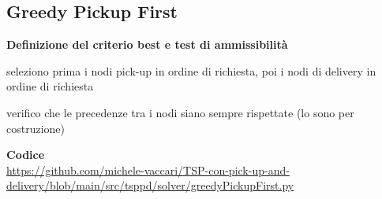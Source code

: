 \documentclass[9pt]{beamer}
\begin{document}
\subsection{Greedy Pickup First}
\begin{frame}[allowframebreaks]{\subsecname}
	\textbf{Definizione del criterio best e test di ammissibilità}
      \begin{description}[style=unboxed,leftmargin=0cm]
        \item[criterio best] seleziono prima i nodi pick-up in ordine di richiesta, poi i nodi di delivery in ordine di richiesta
	  \item[test di ammissibilità] verifico che le precedenze tra i nodi siano sempre rispettate (lo sono per costruzione)
      \end{description}

	\textbf{Codice} \\
		\href{https://github.com/michele-vaccari/TSP-con-pick-up-and-delivery/blob/main/src/tsppd/solver/greedyPickupFirst.py}{https://github.com/michele-vaccari/TSP-con-pick-up-and-delivery/blob/main/src/tsppd/solver/greedyPickupFirst.py}

\framebreak


\end{frame}
\end{document}
